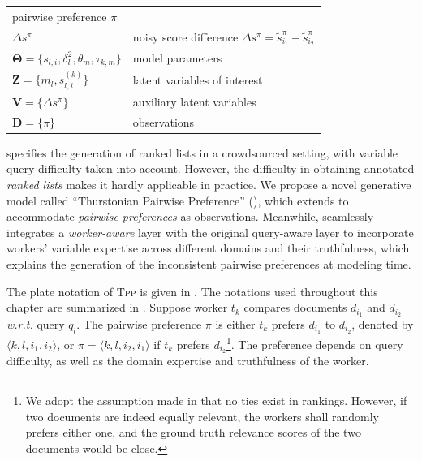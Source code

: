 \begin{table}[h!]
\begin{center}
\begin{tabular}{ll}
      pairwise preference $\pi$\\
$\Delta s^{\pi}$ 					                                        &
      noisy score difference
      $\Delta s^{\pi} = \tilde{s}_{i_1}^{\pi} - \tilde{s}_{i_2}^{\pi}$  \\
$\mathbf{\Theta} = \{ s_{l,i}, \delta_l^2, \theta_m, \tau_{k,m}\}$ 	&
      model parameters \\
$\mathbf{Z} = \{m_l, s_{l,i}^{(k)}\}$ 							              	&
      latent variables of interest \\
$\mathbf{V} = \{\Delta s^{\pi}\}$									                  &
      auxiliary latent variables \\
$\mathbf{D} = \{\pi\}$											                        &
      observations \\
\hline
\end{tabular}
\end{center}
\end{table}%

\trm{}  specifies the generation of ranked lists in a crowdsourced setting, with
variable query difficulty taken into account. However, the difficulty in
obtaining annotated \emph{ranked lists} makes it hardly applicable in practice.
We propose a novel generative model called ``Thurstonian Pairwise Preference''
(\tpp{}), which extends \trm{} to accommodate \emph{pairwise preferences} as
observations. Meanwhile, \tpp{} seamlessly integrates a \emph{worker-aware}
layer with the original query-aware layer to incorporate workers' variable
expertise across different domains and their truthfulness, which explains the
generation of the inconsistent pairwise preferences at modeling time.

The plate notation of \textsc{Tpp} is given in . The
notations used throughout this chapter are summarized in
. Suppose worker $t_k$ compares documents $d_{i_1}$ and
$d_{i_2}$ \emph{w.r.t.} query $q_l$. The pairwise preference $\pi$ is either
$t_k$ prefers $d_{i_1}$ to $d_{i_2}$, denoted by $\langle k, l, i_1, i_2
\rangle$, or $\pi = \langle k, l, i_2, i_1 \rangle$ if $t_k$ prefers
$d_{i_2}$\footnote{We adopt the assumption made in \trm{} that no ties exist in
rankings. However, if two documents are indeed equally relevant, the workers
shall randomly prefers either one, and the ground truth relevance scores of
the two documents would be close.}. The preference depends on query
difficulty, as well as the domain expertise and truthfulness of the worker.

